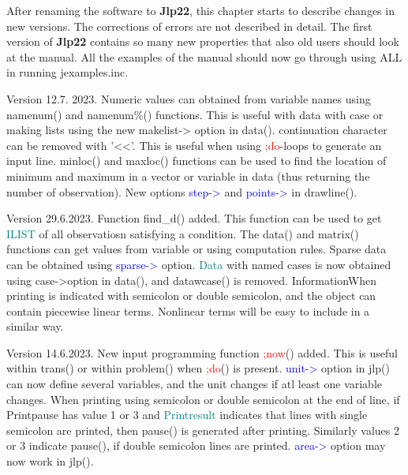  
 
After renaming the software to \textbf{Jlp22}, this chapter starts to describe changes in new versions. 
The corrections of errors are not described in detail. The first version of \textbf{Jlp22} contains so many new properties that also old users 
should look at the manual. All the examples of the manual should now go through using ALL in running 
jexamples.inc. 
 
Version 12.7. 2023. Numeric values can obtained from variable names using namenum() and 
namenum\%() functions. This is useful with data with case or making lists using the new makelist-> option in \textcolor{VioletRed}{data}(). 
continuation character can be removed with '<<'. This is useful when using \textcolor{Red}{;do}-loops to generate 
an input line. \textcolor{VioletRed}{minloc}() and \textcolor{VioletRed}{maxloc}() functions can be used to find the location of minimum 
and maximum in a vector or variable in data (thus returning the number of observation). 
New options \textcolor{blue}{step->} and \textcolor{blue}{points->} in \textcolor{VioletRed}{drawline}(). 
 
Version 29.6.2023. Function find\_d() added. This function can be used to get \textcolor{teal}{ILIST} 
of all observatiosn satisfying a condition. The \textcolor{VioletRed}{data}() and \textcolor{VioletRed}{matrix}() functions can get values 
from variable or using computation rules. Sparse data can be obtained using \textcolor{blue}{sparse->} 
option. \textcolor{teal}{Data} with named cases is now obtained using case->option in \textcolor{VioletRed}{data}(), 
and \textcolor{VioletRed}{datawcase}() is removed. InformationWhen printing is indicated with semicolon or double semicolon, and the object 
can contain piecewise linear terms. Nonlinear terms will be easy to include in  a similar way. 
 
 
Version   14.6.2023. New input programming function \textcolor{Red}{;now}() added. This is useful 
within \textcolor{VioletRed}{trans}() or within \textcolor{VioletRed}{problem}() when \textcolor{Red}{;do}() is present. \textcolor{blue}{unit->} option in \textcolor{VioletRed}{jlp}() can now define 
several variables, and the unit changes if atl least one variable changes. 
When printing using semicolon or double semicolon at the end of line, if Printpause has value 1 or 3 and 
\textcolor{teal}{Printresult} indicates that lines with single semicolon are printed, then 
\textcolor{VioletRed}{pause}() is generated after printing. Similarly values 2 or 3 indicate \textcolor{VioletRed}{pause}(), if double semicolon lines 
are printed. \textcolor{blue}{area->} option may now work in \textcolor{VioletRed}{jlp}(). 
 
